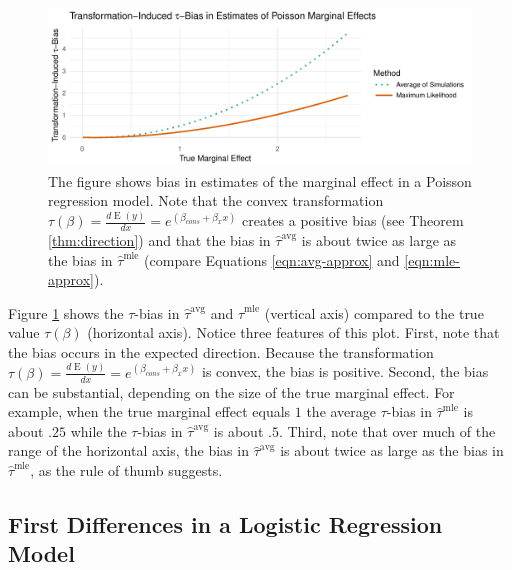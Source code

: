 \documentclass[11pt]{article}
\DeclareMathOperator*{\E}{\text{E}}
\begin{document}
\begin{figure}[h!]
\begin{center}
\includegraphics[scale = 0.65]{figs/poisson-mcs.pdf}
\vspace{.1in}
\caption{The figure shows bias in estimates of the marginal effect in a Poisson regression model.
Note that the convex transformation $\tau(\beta) = \frac{d \E (y)}{dx} = e^{(\beta_{cons} + \beta_x x)}$ creates a positive bias (see Theorem \ref{thm:direction}) and that the bias in $\hat{\tau}^\text{avg}$ is about twice as large as the bias in $\hat{\tau}^\text{mle}$ (compare Equations \ref{eqn:avg-approx} and \ref{eqn:mle-approx}).}\label{fig:poisson-mcs}
\end{center}
\end{figure}

Figure \ref{fig:poisson-mcs} shows the $\tau$-bias in $\hat{\tau}^\text{avg}$ and $\hat{\tau}^\text{mle}$ (vertical axis) compared to the true value $\tau(\beta)$ (horizontal axis).
Notice three features of this plot.
First, note that the bias occurs in the expected direction.
Because the transformation $\tau(\beta) = \frac{d \E (y)}{dx} = e^{(\beta_{cons} + \beta_x x)}$ is convex, the bias is positive.
Second, the bias can be substantial, depending on the size of the true marginal effect.
For example, when the true marginal effect equals $1$ the average  $\tau$-bias in $\hat{\tau}^\text{mle}$ is about $.25$ while the $\tau$-bias in $\hat{\tau}^\text{avg}$ is about $.5$.
Third, note that over much of the range of the horizontal axis, the bias in $\hat{\tau}^\text{avg}$ is about twice as large as the bias in $\hat{\tau}^\text{mle}$, as the rule of thumb suggests.


\subsection*{First Differences in a Logistic Regression Model}
\end{document}
